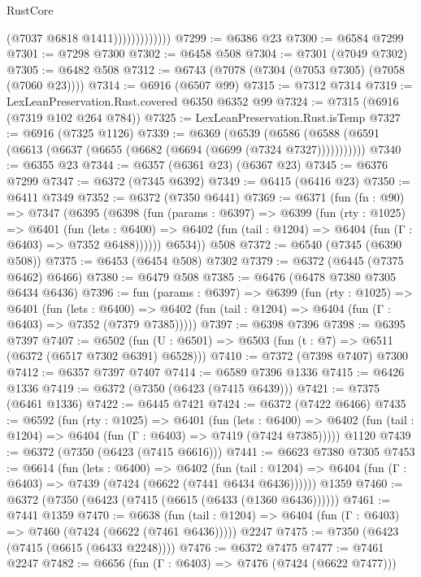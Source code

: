 \begin{lexlean}{RustCore}
\begin{coremodule}
                            (@7037 @6818 @1411)))))))))))))
@7299 := @6386 @23
@7300 := @6584 @7299
@7301 := @7298 @7300
@7302 := @6458 @508
@7304 := @7301 (@7049 @7302)
@7305 := @6482 @508
@7312 := @6743 (@7078 (@7304 (@7053 @7305) (@7058 (@7060 @23))))
@7314 := @6916 (@6507 @99)
@7315 := @7312 @7314
@7319 := LexLeanPreservation.Rust.covered @6350 @6352 @99
@7324 := @7315 (@6916 (@7319 @102 @264 @784))
@7325 := LexLeanPreservation.Rust.isTemp
@7327 := @6916 (@7325 @1126)
@7339 := @6369
    (@6539 (@6586 (@6588 (@6591 (@6613 (@6637 (@6655 (@6682 (@6694 (@6699 (@7324 @7327)))))))))))
@7340 := @6355 @23
@7344 := @6357 (@6361 @23) (@6367 @23)
@7345 := @6376 @7299
@7347 := @6372 (@7345 @6392)
@7349 := @6415 (@6416 @23)
@7350 := @6411 @7349
@7352 := @6372 (@7350 @6441)
@7369 := @6371
    (fun (fn : @90) =>
    @7347
      (@6395
        (@6398
          (fun (params : @6397) =>
          @6399
            (fun (rty : @1025) =>
            @6401
              (fun (lets : @6400) =>
              @6402 (fun (tail : @1204) => @6404 (fun (Γ : @6403) => @7352 @6488))))))
        @6534))
    @508
@7372 := @6540 (@7345 (@6390 @508))
@7375 := @6453 (@6454 @508) @7302
@7379 := @6372 (@6445 (@7375 @6462) @6466)
@7380 := @6479 @508
@7385 := @6476 (@6478 @7380 @7305 @6434 @6436)
@7396 := fun (params : @6397) =>
  @6399
    (fun (rty : @1025) =>
    @6401
      (fun (lets : @6400) =>
      @6402 (fun (tail : @1204) => @6404 (fun (Γ : @6403) => @7352 (@7379 @7385)))))
@7397 := @6398 @7396
@7398 := @6395 @7397
@7407 := @6502 (fun (U : @6501) => @6503 (fun (t : @7) => @6511 (@6372 (@6517 @7302 @6391) @6528)))
@7410 := @7372 (@7398 @7407) @7300
@7412 := @6357 @7397 @7407
@7414 := @6589 @7396 @1336
@7415 := @6426 @1336
@7419 := @6372 (@7350 (@6423 (@7415 @6439)))
@7421 := @7375 (@6461 @1336)
@7422 := @6445 @7421
@7424 := @6372 (@7422 @6466)
@7435 := @6592
    (fun (rty : @1025) =>
    @6401
      (fun (lets : @6400) =>
      @6402 (fun (tail : @1204) => @6404 (fun (Γ : @6403) => @7419 (@7424 @7385)))))
    @1120
@7439 := @6372 (@7350 (@6423 (@7415 @6616)))
@7441 := @6623 @7380 @7305
@7453 := @6614
    (fun (lets : @6400) =>
    @6402
      (fun (tail : @1204) => @6404 (fun (Γ : @6403) => @7439 (@7424 (@6622 (@7441 @6434 @6436))))))
    @1359
@7460 := @6372 (@7350 (@6423 (@7415 (@6615 (@6433 (@1360 @6436))))))
@7461 := @7441 @1359
@7470 := @6638
    (fun (tail : @1204) => @6404 (fun (Γ : @6403) => @7460 (@7424 (@6622 (@7461 @6436)))))
    @2247
@7475 := @7350 (@6423 (@7415 (@6615 (@6433 @2248))))
@7476 := @6372 @7475
@7477 := @7461 @2247
@7482 := @6656 (fun (Γ : @6403) => @7476 (@7424 (@6622 @7477)))

\end{coremodule}
\end{lexlean}
